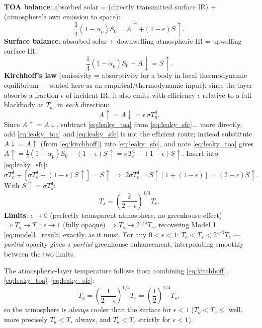\documentclass[11pt]{article}
\begin{document}
\textbf{TOA balance}: absorbed solar = (directly transmitted surface IR) + (atmosphere's own emission to space):
\begin{equation}
\frac{1}{4}(1-\alpha_p)S_0 = A\uparrow + (1-\epsilon)S\uparrow.
\label{eq:leaky_toa}
\end{equation}
\textbf{Surface balance}: absorbed solar + downwelling atmospheric IR = upwelling surface IR:
\begin{equation}
\frac{1}{4}(1-\alpha_p)S_0 + A\downarrow = S\uparrow.
\label{eq:leaky_sfc}
\end{equation}
\textbf{Kirchhoff's law} (emissivity = absorptivity for a body in local thermodynamic equilibrium — stated here as an empirical/thermodynamic input): since the layer absorbs a fraction $\epsilon$ of incident IR, it also emits with efficiency $\epsilon$ relative to a full blackbody at $T_a$, in \emph{each} direction:
\begin{equation}
A\uparrow = A\downarrow = \epsilon\,\sigma T_a^4.
\label{eq:kirchhoff}
\end{equation}
Since $A\uparrow=A\downarrow$, subtract \eqref{eq:leaky_toa} from \eqref{eq:leaky_sfc}... more directly, add \eqref{eq:leaky_toa} and \eqref{eq:leaky_sfc} is not the efficient route; instead substitute $A\downarrow=A\uparrow$ (from \eqref{eq:kirchhoff}) into \eqref{eq:leaky_sfc}, and note \eqref{eq:leaky_toa} gives $A\uparrow = \tfrac14(1-\alpha_p)S_0 - (1-\epsilon)S\uparrow = \sigma T_e^4-(1-\epsilon)S\uparrow$. Insert into \eqref{eq:leaky_sfc}:
\begin{equation}
\sigma T_e^4 + \left[\sigma T_e^4 - (1-\epsilon)S\uparrow\right] = S\uparrow
\ \Longrightarrow\ 2\sigma T_e^4 = S\uparrow\left[1+(1-\epsilon)\right] = (2-\epsilon)S\uparrow.
\end{equation}
With $S\uparrow=\sigma T_s^4$:
\begin{equation}
\boxed{T_s = \left(\frac{2}{2-\epsilon}\right)^{1/4}T_e}.
\label{eq:leaky_result}
\end{equation}
\textbf{Limits}: $\epsilon\to0$ (perfectly transparent atmosphere, no greenhouse effect) $\Rightarrow T_s\to T_e$; $\epsilon\to1$ (fully opaque) $\Rightarrow T_s\to2^{1/4}T_e$, recovering Model 1 \eqref{eq:model1_result} exactly, as it must. For any $0<\epsilon<1$: $T_e<T_s<2^{1/4}T_e$ — \emph{partial} opacity gives a \emph{partial} greenhouse enhancement, interpolating smoothly between the two limits.

The atmospheric-layer temperature follows from combining \eqref{eq:kirchhoff}, \eqref{eq:leaky_toa}--\eqref{eq:leaky_sfc}:
\begin{equation}
T_a = \left(\frac{1}{2-\epsilon}\right)^{1/4}T_e = \left(\frac{1}{2}\right)^{1/4}T_s,
\end{equation}
so the atmosphere is \emph{always} cooler than the surface for $\epsilon<1$ ($T_a<T_e\le$ well, more precisely $T_a<T_s$ always, and $T_a<T_e$ strictly for $\epsilon<1$).
\end{document}
